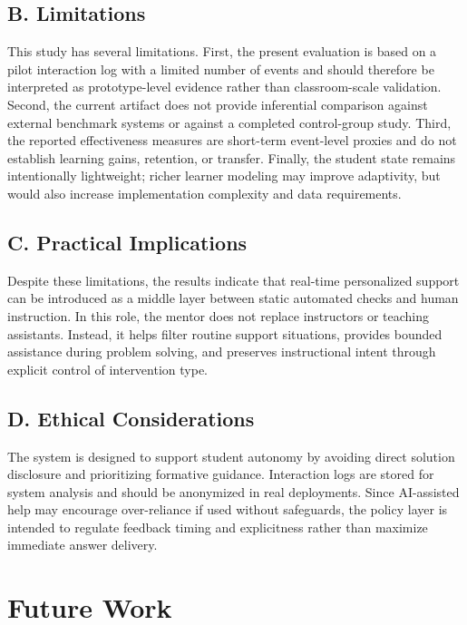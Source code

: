 \documentclass[conference]{IEEEtran}
\begin{document}
\subsection*{B. Limitations}

This study has several limitations. First, the present evaluation is based on a pilot interaction log with a limited number of events and should therefore be interpreted as prototype-level evidence rather than classroom-scale validation. Second, the current artifact does not provide inferential comparison against external benchmark systems or against a completed control-group study. Third, the reported effectiveness measures are short-term event-level proxies and do not establish learning gains, retention, or transfer. Finally, the student state remains intentionally lightweight; richer learner modeling may improve adaptivity, but would also increase implementation complexity and data requirements.

\subsection*{C. Practical Implications}

Despite these limitations, the results indicate that real-time personalized support can be introduced as a middle layer between static automated checks and human instruction. In this role, the mentor does not replace instructors or teaching assistants. Instead, it helps filter routine support situations, provides bounded assistance during problem solving, and preserves instructional intent through explicit control of intervention type.

\subsection*{D. Ethical Considerations}

The system is designed to support student autonomy by avoiding direct solution disclosure and prioritizing formative guidance. Interaction logs are stored for system analysis and should be anonymized in real deployments. Since AI-assisted help may encourage over-reliance if used without safeguards, the policy layer is intended to regulate feedback timing and explicitness rather than maximize immediate answer delivery.

\section{Future Work}
\end{document}
